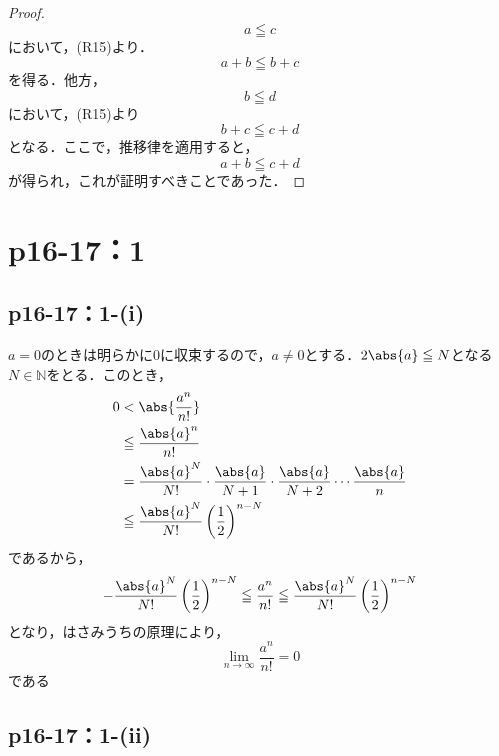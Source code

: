 \documentclass[a4paper,10pt,fleqn]{ltjsarticle}
\begin{document}
        \begin{leftbar}
            \begin{proof}
                \[
                    a \leqq c
                \]
                において，(R15)より．
                \[
                    a+b \leqq b+c
                \]
                を得る．他方，
                \[
                    b \leqq d
                \]
                において，(R15)より
                \[
                    b + c \leqq c+d
                \]
                となる．ここで，推移律を適用すると，
                \[
                    a+b \leqq c+d
                \]
                が得られ，これが証明すべきことであった．
            \end{proof}
            \end{leftbar}
%
\section*{p16-17：1}

\subsection*{p16-17：1-(i)}

\begin{tleftbar}
    $a=0$のときは明らかに$0$に収束するので，$a \ne 0$とする．$2\abs{a} \le N$となる$N \in \mathbb{N}$をとる．このとき，
    \begin{align*}
         0 &< \abs{ \frac{a^n}{n!} } \\
         &\le \frac{\abs{a}^n}{n!} \\
         &= \frac{\abs{a}^{N}}{N!} \cdot \frac{\abs{a}}{N+1} \cdot \frac{\abs{a}}{N+2} \dotsm \frac{\abs{a}}{n} \\
         & \le  \frac{\abs{a}^{N}}{N!} \left(\frac{1}{2} \right)^{n-N}
    \end{align*}
    であるから，
    \[
        - \frac{\abs{a}^{N}}{N!} \left(\frac{1}{2} \right)^{n-N} \le  \frac{a^n}{n!} \le \frac{\abs{a}^{N}}{N!} \left(\frac{1}{2} \right)^{n-N}
    \]
    となり，はさみうちの原理により，
    \[
        \lim_{n \to \infty} \frac{a^n}{n!} =0
    \]
    である
\end{tleftbar}

\subsection*{p16-17：1-(ii)}
\end{document}
